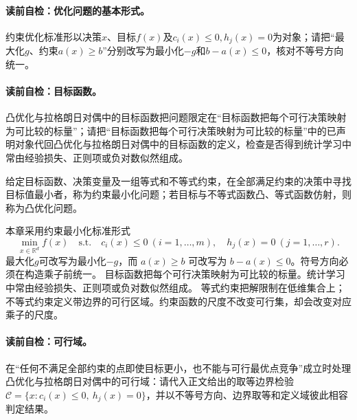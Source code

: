 \paragraph{读前自检：优化问题的基本形式。}约束优化标准形以决策$x$、目标$f(x)$及$c_i(x)\le0,h_j(x)=0$为对象；请把“最大化$g$、约束$a(x)\ge b$”分别改写为最小化$-g$和$b-a(x)\le0$，核对不等号方向统一。\par

\label{struct:V1-C07-CH06}
\paragraph{读前自检：目标函数。}凸优化与拉格朗日对偶中的目标函数把问题限定在“目标函数把每个可行决策映射为可比较的标量”；请把“目标函数把每个可行决策映射为可比较的标量”中的已声明对象代回凸优化与拉格朗日对偶中的目标函数的定义，检查是否得到统计学习中常由经验损失、正则项或负对数似然组成。\par

\begin{definition}[约束优化问题]\label{struct:V1-C07-CH07}
给定目标函数、决策变量及一组等式和不等式约束，在全部满足约束的决策中寻找目标值最小者，称为约束最小化问题；若目标与不等式函数凸、等式函数仿射，则称为凸优化问题。
\end{definition}
本章采用约束最小化标准形式
\[
\min_{x\in\mathbb R^d} f(x)
\quad\text{s.t.}\quad c_i(x)\le0\ (i=1,\ldots,m),\quad h_j(x)=0\ (j=1,\ldots,r).
\]
最大化$g$可改写为最小化$-g$，而 $a(x)\ge b$ 可改写为 $b-a(x)\le0$。符号方向必须在构造乘子前统一。
目标函数把每个可行决策映射为可比较的标量。统计学习中常由经验损失、正则项或负对数似然组成。
等式约束把解限制在低维集合上；不等式约束定义带边界的可行区域。约束函数的尺度不改变可行集，却会改变对应乘子的尺度。

\paragraph{读前自检：可行域。}在“任何不满足全部约束的点即使目标更小，也不能与可行最优点竞争”成立时处理凸优化与拉格朗日对偶中的可行域：请代入正文给出的取等边界检验$\mathcal C=\{x:c_i(x)\le0,\ h_j(x)=0\}$，并以不等号方向、边界取等和定义域彼此相容判定结果。\par
